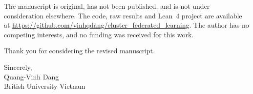\documentclass[10.5pt]{article}
\begin{document}
The manuscript is original, has not been published, and is not under consideration elsewhere. The code, raw results and Lean~4 project are available at \url{https://github.com/vinhqdang/cluster_federated_learning}. The author has no competing interests, and no funding was received for this work.

Thank you for considering the revised manuscript.

Sincerely,\\[1.2em]
Quang-Vinh Dang\\
British University Vietnam
\end{document}
